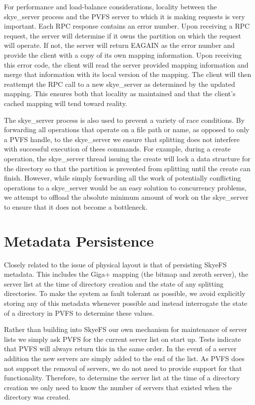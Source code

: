 \documentclass[letterpaper]{article}
\begin{document}
For performance and load-balance considerations, locality between the
skye\_\-server process and the PVFS server to which it is making requests is very
important.  Each RPC response contains an error number.  Upon receiving a RPC
request, the server will determine if it owns the partition on which the request
will operate.  If not, the server will return EAGAIN as the error number and
provide the client with a copy of its own mapping information.
Upon receiving this error code, the client will read the server provided mapping
information and merge that information with its local version of the mapping.
The client will then reattempt the RPC call to a new skye\_\-server as determined
by the updated mapping.  This ensures both that locality as maintained and that
the client's cached mapping will tend toward reality.

The skye\_\-server process is also used to prevent a variety of race conditions.
By forwarding all operations that operate on a file path or name, as opposed to
only a PVFS handle, to the skye\_\-server we ensure that splitting does not
interfere with successful execution of thees commands.  For example, during a
create operation, the skye\_\-server thread issuing the create will lock a data
structure for the directory so that the partition is prevented from splitting
until the create can finish.  However, while simply forwarding all the work of
potentially conflicting operations to a skye\_\-server would be an easy solution to
concurrency problems, we attempt to offload the absolute minimum amount of work
on the skye\_\-server to ensure that it does not become a bottleneck.

\section{Metadata Persistence}
Closely related to the issue of physical layout is that of persisting SkyeFS
metadata.  This includes the Giga+ mapping (the bitmap and zeroth server), the
server list at the time of directory creation and the state of any splitting
directories.  To make the system as fault tolerant as possible, we avoid
explicitly storing any of this metadata whenever possible and instead
interrogate the state of a directory in PVFS to determine these values.

Rather than building into SkyeFS our own mechanism for maintenance of server
lists we simply ask PVFS for the current server list on start up.  Tests indicate
that PVFS will always return this in the same order.  In the event of a server
addition the new servers are simply added to the end of the list.  As PVFS does
not support the removal of servers, we do not need to provide support for that
functionality.  Therefore, to determine the server list at the time of a
directory creation we only need to know the number of servers that existed when
the directory was created.
\end{document}
